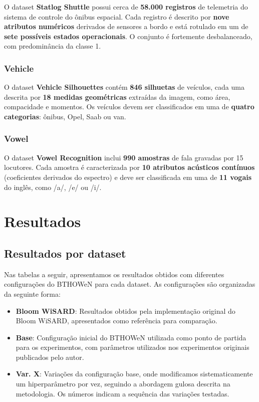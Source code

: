 \documentclass{article}
\begin{document}
O dataset \textbf{Statlog Shuttle} possui cerca de \textbf{58.000 registros} de telemetria do sistema de controle do ônibus espacial. Cada registro é descrito por \textbf{nove atributos numéricos} derivados de sensores a bordo e está rotulado em um de \textbf{sete possíveis estados operacionais}. O conjunto é fortemente desbalanceado, com predominância da classe 1.

\subsubsection{Vehicle}

O dataset \textbf{Vehicle Silhouettes} contém \textbf{846 silhuetas} de veículos, cada uma descrita por \textbf{18 medidas geométricas} extraídas da imagem, como área, compacidade e momentos. Os veículos devem ser classificados em uma de \textbf{quatro categorias}: ônibus, Opel, Saab ou van.

\subsubsection{Vowel}

O dataset \textbf{Vowel Recognition} inclui \textbf{990 amostras} de fala gravadas por 15 locutores. Cada amostra é caracterizada por \textbf{10 atributos acústicos contínuos} (coeficientes derivados do espectro) e deve ser classificada em uma de \textbf{11 vogais} do inglês, como /a/, /e/ ou /i/.

\section{Resultados}

\subsection{Resultados por dataset}

Nas tabelas a seguir, apresentamos os resultados obtidos com diferentes configurações do BTHOWeN para cada dataset. As configurações são organizadas da seguinte forma:

\begin{itemize}
    \item \textbf{Bloom WiSARD}: Resultados obtidos pela implementação original do Bloom WiSARD, apresentados como referência para comparação.
    \item \textbf{Base}: Configuração inicial do BTHOWeN utilizada como ponto de partida para os experimentos, com parâmetros utilizados nos experimentos originais publicados pelo autor.
    \item \textbf{Var. X}: Variações da configuração base, onde modificamos sistematicamente um hiperparâmetro por vez, seguindo a abordagem gulosa descrita na metodologia. Os números indicam a sequência das variações testadas.
\end{itemize}
\end{document}

